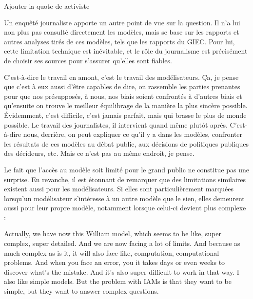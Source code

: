 \begin{authoredquote}
    Ajouter la quote de activiste
\end{authoredquote}




Un enquêté journaliste apporte un autre point de vue sur la question. Il n'a lui non plus pas consulté directement les modèles, mais se base sur les rapports et autres analyses tirés de ces modèles, tels que les rapports du GIEC. Pour lui, cette limitation technique est inévitable, et le rôle du journalisme est précisément de choisir ses sources pour s'assurer qu'elles sont fiables. 

\begin{authoredquote}
    C'est-à-dire le travail en amont, c'est le travail des modélisateurs. Ça, je pense que c'est à eux aussi d'être capables de dire, on rassemble les parties prenantes pour que nos présupposés, à nous, nos biais soient confrontés à d'autres biais et qu'ensuite on trouve le meilleur équilibrage de la manière la plus sincère possible. Évidemment, c'est difficile, c'est jamais parfait, mais qui brasse le plus de monde possible. Le travail des journalistes, il intervient quand même plutôt après. C'est-à-dire nous, derrière, on peut expliquer ce qu'il y a dans les modèles, confronter les résultats de ces modèles au débat public, aux décisions de politiques publiques des décideurs, etc. Mais ce n'est pas au même endroit, je pense.
\end{authoredquote}


Le fait que l'accès au modèle soit limité pour le grand public ne constitue pas une surprise. En revanche, il est étonnant de remarquer que des limitations similaires existent  aussi pour les modélisateurs. Si elles sont particulièrement marquées lorsqu'un modélisateur s'intéresse à un autre modèle que le sien, elles demeurent aussi pour leur propre modèle, notamment lorsque celui-ci devient plus complexe : 


\begin{authoredquote}
    Actually, we have now this William model, which seems to be like,  super complex, super detailed. And we are now facing a lot of limits. And because as much complex as is it, it will also face like, computation, computational problems. And when  you face an error, you it takes days or even weeks to discover what's the mistake. And it's also super difficult to work in that way. I also like simple models. But the problem with IAMs is that they want to be simple, but they want to answer complex questions.
\end{authoredquote}

